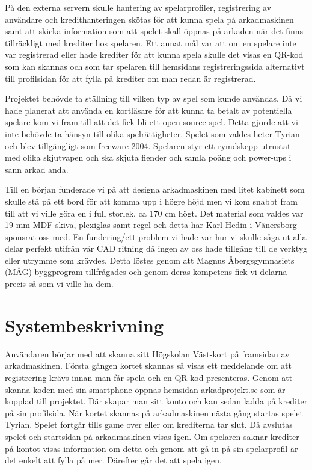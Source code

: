 \documentclass[12pt,fleqn,openany]{book} %
\begin{document}
På den externa servern skulle hantering av spelarprofiler, registrering av användare och kredithanteringen skötas för att kunna spela på arkadmaskinen
samt att skicka information som att spelet skall öppnas på arkaden när det finns tillräckligt med krediter hos spelaren. Ett annat mål 
var att om en spelare inte var registrerad eller hade krediter för att kunna spela skulle det visas en QR-kod som kan skannas och som 
tar spelaren till hemsidans registreringssida alternativt till profilsidan för att fylla på krediter om man redan är registrerad. 

Projektet behövde ta ställning till vilken typ av spel som kunde användas. Då vi hade planerat att använda en kortläsare för att kunna 
ta betalt av potentiella spelare kom vi fram till att det fick bli ett open-source spel. Detta gjorde att vi inte behövde ta hänsyn till
olika spelrättigheter. Spelet som valdes heter Tyrian och blev tillgängligt som freeware 2004. Spelaren styr ett rymdskepp utrustat med 
olika skjutvapen och ska skjuta fiender och samla poäng och power-ups i sann arkad anda.

Till en början funderade vi på att designa arkadmaskinen med litet kabinett som skulle stå på ett bord för att komma upp i högre höjd
men vi kom snabbt fram till att vi ville göra en i full storlek, ca 170 cm högt. Det material som valdes var 19 mm MDF skiva, plexiglas
samt regel och detta har Karl Hedin i Vänersborg sponsrat oss med. En fundering/ett problem vi hade var hur vi skulle såga ut alla delar
perfekt utifrån vår CAD ritning då ingen av oss hade tillgång till de verktyg eller utrymme som krävdes. Detta löstes genom att Magnus
Åbergsgymnasiets (MÅG) byggprogram tillfrågades och genom deras kompetens fick vi delarna precis så som vi ville ha dem.

\section{Systembeskrivning}
Användaren börjar med att skanna sitt Högskolan Väst-kort på framsidan av arkadmaskinen. Första gången kortet skannas så visas ett 
meddelande om att registrering krävs innan man får spela och en QR-kod presenteras. Genom att skanna koden med sin smartphone öppnas 
hemsidan arkadprojekt.se som är kopplad till projektet. Där skapar man sitt konto och kan sedan ladda på krediter på sin profilsida. 
När kortet skannas på arkadmaskinen nästa gång startas spelet Tyrian. Spelet fortgår tills game over eller om krediterna tar slut. 
Då avslutas spelet och startsidan på arkadmaskinen visas igen. Om spelaren saknar krediter på kontot visas information om detta och 
genom att gå in på sin spelarprofil är det enkelt att fylla på mer. Därefter går det att spela igen.
\bigskip
\end{document}
